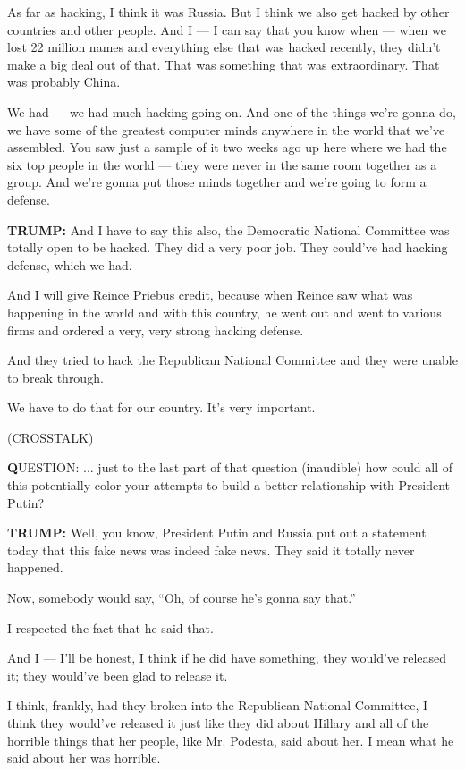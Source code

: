 As far as hacking, I think it was Russia. But I think we also get hacked
by other countries and other people. And I --- I can say that you know
when --- when we lost 22 million names and everything else that was
hacked recently, they didn't make a big deal out of that. That was
something that was extraordinary. That was probably China.

We had --- we had much hacking going on. And one of the things we're
gonna do, we have some of the greatest computer minds anywhere in the
world that we've assembled. You saw just a sample of it two weeks ago up
here where we had the six top people in the world --- they were never in
the same room together as a group. And we're gonna put those minds
together and we're going to form a defense.

\textbf{TRUMP:} And I have to say this also, the Democratic National
Committee was totally open to be hacked. They did a very poor job. They
could've had hacking defense, which we had.

And I will give Reince Priebus credit, because when Reince saw what was
happening in the world and with this country, he went out and went to
various firms and ordered a very, very strong hacking defense.

And they tried to hack the Republican National Committee and they were
unable to break through.

We have to do that for our country. It's very important.

(CROSSTALK)

\textbf{Q}UESTION: ... just to the last part of that question
(inaudible) how could all of this potentially color your attempts to
build a better relationship with President Putin?

\textbf{TRUMP:} Well, you know, President Putin and Russia put out a
statement today that this fake news was indeed fake news. They said it
totally never happened.

Now, somebody would say, ``Oh, of course he's gonna say that.''

I respected the fact that he said that.

And I --- I'll be honest, I think if he did have something, they
would've released it; they would've been glad to release it.

I think, frankly, had they broken into the Republican National
Committee, I think they would've released it just like they did about
Hillary and all of the horrible things that her people, like Mr.
Podesta, said about her. I mean what he said about her was horrible.

